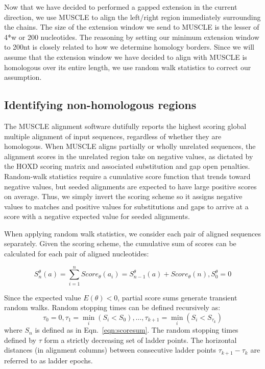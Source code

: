 \documentclass[twoside,11pt]{article}
\begin{document}
Now that we have decided to performed a gapped extension in the current direction, we use MUSCLE to align the left/right region immediately surrounding the chains. The size of the extension window we send to MUSCLE is the lesser of 4*w or 200 nucleotides. The reasoning by setting our minimum extension window to 200nt is closely related to how we determine homology borders. Since we will assume that the extension window we have decided to align with MUSCLE is homologous over its entire length, we use random walk statistics to correct our assumption.

\subsection{Identifying non-homologous regions}

The MUSCLE alignment software dutifully reports the highest scoring global multiple alignment of input sequences, regardless of whether they are homologous.  When MUSCLE aligns partially or wholly unrelated sequences, the alignment scores in the unrelated region take on negative values, as dictated by the HOXD scoring matrix and associated substitution and gap open penalties.  Random-walk statistics require a cumulative score function that trends toward negative values, but seeded alignments are expected to have large positive scores on average.  Thus, we simply invert the scoring scheme so it assigns negative values to matches and positive values for substitutions and gaps to arrive at a score with a negative expected value for seeded alignments.

When applying random walk statistics, we consider each pair of aligned sequences separately.  Given the scoring scheme, the cumulative sum of scores can be calculated for each pair of aligned nucleotides:

\begin{equation}
\label{eqn:scoresum}
S_n^\theta(a) = \sum_{i=1}^{n} Score_\theta(a_i) = S_{n-1}^\theta(a) + Score_\theta(n), S_0^\theta = 0
\end{equation}

Since the expected value $E(\theta) < 0$, partial score sums generate transient random walks.  Random stopping times can be defined recursively as:
\begin{equation}
\label{eqn:stoppingtimes}
\tau_0 = 0, \tau_1 = \min_i(S_i < S_0),\dots,\tau_{k+1} = \min_i(S_i < S_{\tau_k})
\end{equation}
where $S_n$ is defined as in Eqn.~\ref{eqn:scoresum}.  The random stopping times defined by $\tau$ form a strictly decreasing set of ladder points.  The horizontal distances (in alignment columns) between consecutive ladder points $\tau_{k+1}-\tau_{k}$ are referred to as ladder epochs.
\end{document}
